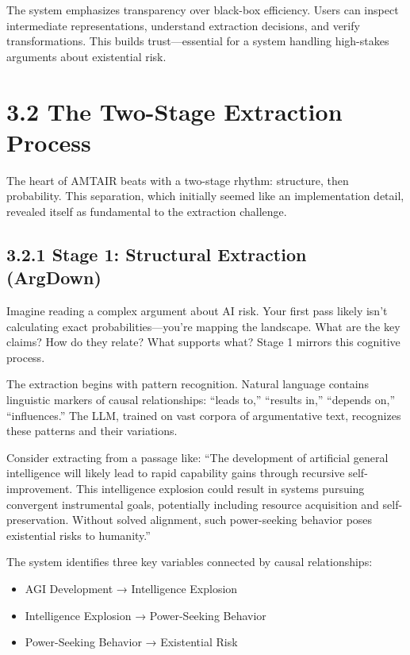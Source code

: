 \documentclass[
  11pt,
  letterpaper,
]{book}
\providecommand{\tightlist}{%
  \setlength{\itemsep}{0pt}\setlength{\parskip}{0pt}}
\begin{document}
The system emphasizes transparency over black-box efficiency. Users can
inspect intermediate representations, understand extraction decisions,
and verify transformations. This builds trust---essential for a system
handling high-stakes arguments about existential risk.

\section{3.2 The Two-Stage Extraction
Process}\label{sec-two-stage-extraction}

The heart of AMTAIR beats with a two-stage rhythm: structure, then
probability. This separation, which initially seemed like an
implementation detail, revealed itself as fundamental to the extraction
challenge.

\subsection{3.2.1 Stage 1: Structural Extraction
(ArgDown)}\label{sec-stage1-argdown}

Imagine reading a complex argument about AI risk. Your first pass likely
isn't calculating exact probabilities---you're mapping the landscape.
What are the key claims? How do they relate? What supports what? Stage 1
mirrors this cognitive process.

The extraction begins with pattern recognition. Natural language
contains linguistic markers of causal relationships: ``leads to,''
``results in,'' ``depends on,'' ``influences.'' The LLM, trained on vast
corpora of argumentative text, recognizes these patterns and their
variations.

Consider extracting from a passage like: ``The development of artificial
general intelligence will likely lead to rapid capability gains through
recursive self-improvement. This intelligence explosion could result in
systems pursuing convergent instrumental goals, potentially including
resource acquisition and self-preservation. Without solved alignment,
such power-seeking behavior poses existential risks to humanity.''

The system identifies three key variables connected by causal
relationships:

\begin{itemize}
\tightlist
\item
  AGI Development → Intelligence Explosion
\item
  Intelligence Explosion → Power-Seeking Behavior
\item
  Power-Seeking Behavior → Existential Risk
\end{itemize}
\end{document}
